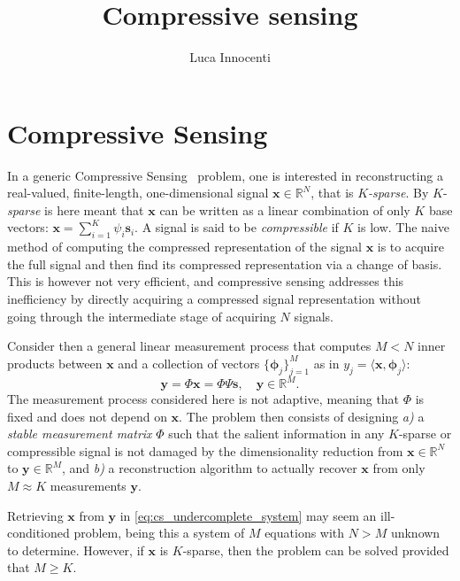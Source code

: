 \documentclass[a4paper, twocolumn]{article}
\title{Compressive sensing}
\author{Luca Innocenti}
\newcommand{\bs}[1]{{\boldsymbol{#1}}}
\begin{document}
\maketitle


\section{Compressive Sensing}
In a generic Compressive Sensing~\cite{donoho2006compressed, baraniuk2007compressive} problem, one is interested in reconstructing a real-valued, finite-length, one-dimensional signal $\bs x\in\mathbb R^N$, that is \textit{$K$-sparse}.
By $K$-\textit{sparse} is here meant that $\bs x$ can be written as a linear combination of only $K$ base vectors: $\bs x = \sum_{i=1}^K \psi_i \bs s_i$.
A signal is said to be \textit{compressible} if $K$ is low.
The naive method of computing the compressed representation of the signal $\bs x$ is to acquire the full signal and then find its compressed representation via a change of basis.
This is however not very efficient, and compressive sensing addresses this inefficiency by directly acquiring a compressed signal representation without going through the intermediate stage of acquiring $N$ signals.

Consider then a general linear measurement process that computes $M<N$ inner products between $\bs x$ and a collection of vectors $\{\bs\phi_j\}_{j=1}^M$ as in $y_j = \langle\bs x, \bs\phi_j\rangle$:
\begin{equation}
	\boldsymbol y=\Phi\bs x
    			 =\Phi\Psi\bs s, \quad \bs y\in\mathbb R^M.
    \label{eq:cs_undercomplete_system}
\end{equation}
The measurement process considered here is not adaptive, meaning that $\Phi$ is fixed and does not depend on $\bs x$.
The problem then consists of designing \textit{a)} a \textit{stable measurement matrix} $\Phi$ such that the salient information in any $K$-sparse or compressible signal is not damaged by the dimensionality reduction from $\bs x\in\mathbb R^N$ to $\bs y\in\mathbb R^M$,
and \textit{b)} a reconstruction algorithm to actually recover $\bs x$ from only $M\approx K$ measurements $\bs y$.

Retrieving $\bs x$ from $\bs y$ in \cref{eq:cs_undercomplete_system} may seem an ill-conditioned problem, being this a system of $M$ equations with $N>M$ unknown to determine.
However, if $\bs x$ is $K$-sparse, then the problem can be solved provided that $M\ge K$.
\end{document}
